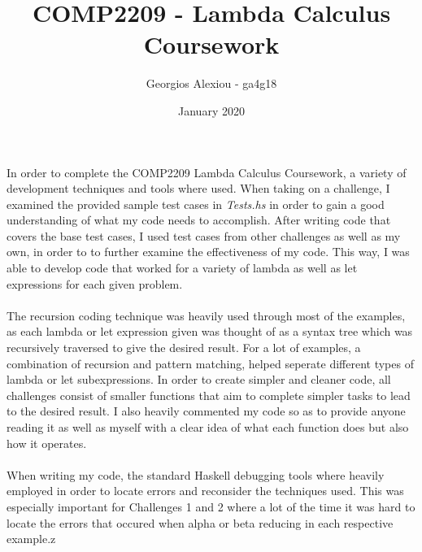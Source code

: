 \documentclass{article}
\title{COMP2209 - Lambda Calculus Coursework}
\author{Georgios Alexiou - ga4g18}
\date{January 2020}
\begin{document}
\maketitle

In order to complete the COMP2209 Lambda Calculus Coursework, 
a variety of development techniques and tools where used. When taking on a
challenge, I examined the provided sample test cases in \textit{Tests.hs} in
order to gain a good understanding of what my code needs to accomplish. After writing
code that covers the base test cases, I used test cases from other challenges as well as my own,
in order to to further examine the effectiveness of my code. This way, I was able to
develop code that worked for a variety of lambda as well as let expressions for each
given problem.  
\\\\
\indent The recursion coding technique was heavily used through most of the examples,
as each lambda or let expression given was thought of as a syntax tree which was
recursively traversed to give the desired result. For a lot of examples, a combination
of recursion and pattern matching, helped seperate different types of lambda or let subexpressions.
In order to create simpler and cleaner code, all challenges consist of smaller functions
that aim to complete simpler tasks to lead to the desired result. I also heavily commented
my code so as to provide anyone reading it as well as myself with a clear idea of what
each function does but also how it operates.
\\\\
\indent When writing my code, the standard Haskell debugging tools where heavily employed
in order to locate errors and reconsider the techniques used. This was especially important for
Challenges 1 and 2 where a lot of the time it was hard to locate the errors that occured when alpha
or beta reducing in each respective example.z
\end{document}
